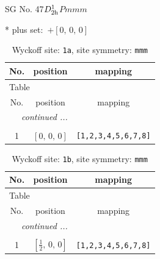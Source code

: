 \documentclass[fleqn,8pt]{jsarticle}
\begin{document}
\setcounter{MaxMatrixCols}{32}

\renewcommand{\tablename}{Table~}
\renewcommand{\figurename}{Figure~}
\begin{center}
\LARGE
SG No. 47\quad$D_{\rm 2h}^{1}$\quad$Pmmm$\quad[ orthorhombic ]
\end{center}
* plus set:\,\,\,$+\left[ 0,\, 0,\, 0 \right]$
\renewcommand{\arraystretch}{1.2}
\begin{longtable}{ccc}
\caption{Wyckoff site: {\tt 1a}, site symmetry: {\tt mmm}}
 \\
 \hline \hline
No. & position & mapping \\ \hline \endfirsthead

\multicolumn{2}{l}{\tablename\ \thetable{}} \\
 \hline \hline
No. & position & mapping \\ \hline \endhead

 \hline \hline
\multicolumn{2}{r}{\footnotesize\it continued ...} \\ \endfoot

 \hline \hline
\multicolumn{2}{r}{} \\ \endlastfoot

1 & $\left[ 0,\, 0,\, 0 \right]$ & {\tt [1,2,3,4,5,6,7,8]} \\
\end{longtable}
\renewcommand{\arraystretch}{1.2}
\begin{longtable}{ccc}
\caption{Wyckoff site: {\tt 1b}, site symmetry: {\tt mmm}}
 \\
 \hline \hline
No. & position & mapping \\ \hline \endfirsthead

\multicolumn{2}{l}{\tablename\ \thetable{}} \\
 \hline \hline
No. & position & mapping \\ \hline \endhead

 \hline \hline
\multicolumn{2}{r}{\footnotesize\it continued ...} \\ \endfoot

 \hline \hline
\multicolumn{2}{r}{} \\ \endlastfoot

1 & $\left[ \frac{1}{2},\, 0,\, 0 \right]$ & {\tt [1,2,3,4,5,6,7,8]} \\
\end{longtable}
\renewcommand{\arraystretch}{1.2}
\end{document}
